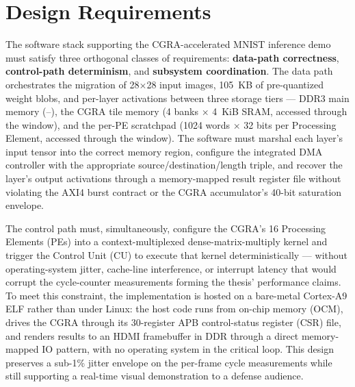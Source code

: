 
\setcounter{section}{0}
\setcounter{figure}{0}
\setcounter{table}{0}
\setcounter{lstlisting}{0}

\section{Design Requirements}
\label{sec:ch4-req}

The software stack supporting the CGRA-accelerated MNIST inference demo
must satisfy three orthogonal classes of requirements: \textbf{data-path
correctness}, \textbf{control-path determinism}, and \textbf{subsystem
coordination}. The data path orchestrates the migration of 28$\times$28
input images, 105~KB of pre-quantized weight blobs, and per-layer
activations between three storage tiers --- DDR3 main memory
(--), the CGRA tile memory
(4 banks $\times$ 4~KiB SRAM, accessed through the
 window), and the per-PE scratchpad
(1024 words $\times$ 32 bits per Processing Element, accessed through the
 window). The software must marshal each layer's input
tensor into the correct memory region, configure the integrated DMA
controller with the appropriate source/destination/length triple, and
recover the layer's output activations through a memory-mapped result
register file without violating the AXI4 burst contract or the CGRA
accumulator's 40-bit saturation envelope.

\begin{sloppypar}
The control path must, simultaneously, configure the CGRA's 16 Processing
Elements (PEs) into a context-multiplexed dense-matrix-multiply kernel
and trigger the Control Unit (CU) to execute that kernel deterministically
--- without operating-system jitter, cache-line interference, or interrupt
latency that would corrupt the cycle-counter measurements forming the
thesis' performance claims. To meet this constraint, the implementation
is hosted on a bare-metal Cortex-A9 ELF rather than under Linux: the host
code runs from on-chip memory (OCM), drives the CGRA through its
30-register APB control-status register (CSR) file, and renders results
to an HDMI framebuffer in DDR through a direct memory-mapped IO pattern,
with no operating system in the critical loop. This design preserves a
sub-1\% jitter envelope on the per-frame cycle measurements while still
supporting a real-time visual demonstration to a defense audience.
\end{sloppypar}

